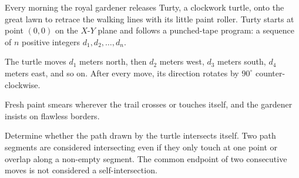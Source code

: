 Every morning the royal gardener releases Turty, a clockwork turtle, onto the great lawn to retrace the walking lines with its little paint roller. Turty starts at point $(0, 0)$ on the $X$-$Y$ plane and follows a punched-tape program: a sequence of $n$ positive integers $d_1, d_2, \ldots, d_n$.

The turtle moves $d_1$ meters north, then $d_2$ meters west, $d_3$ meters south, $d_4$ meters east, and so on. After every move, its direction rotates by $90^\circ$ counter-clockwise.

Fresh paint smears wherever the trail crosses or touches itself, and the gardener insists on flawless borders.

Determine whether the path drawn by the turtle intersects itself. Two path segments are considered intersecting even if they only touch at one point or overlap along a non-empty segment. The common endpoint of two consecutive moves is not considered a self-intersection.
